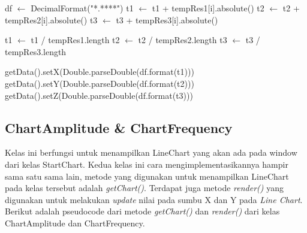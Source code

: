 \begin{itemize}
\begin{algorithm}
\begin{algorithmic}[1]
                    \State df $\leftarrow$ DecimalFormat("*.****")
                        \State t1 $\leftarrow$ t1 + tempRes1[i].absolute()
                        \State t2 $\leftarrow$ t2 + tempRes2[i].absolute()
                        \State t3 $\leftarrow$ t3 + tempRes3[i].absolute()
                    \EndFor
                    
                    \State t1 $\leftarrow$ t1 / tempRes1.length
                    \State t2 $\leftarrow$ t2 / tempRes2.length
                    \State t3 $\leftarrow$ t3 / tempRes3.length
                    
                    \State getData().setX(Double.parseDouble(df.format(t1)))
                    \State getData().setY(Double.parseDouble(df.format(t2)))
                    \State 
                    getData().setZ(Double.parseDouble(df.format(t3)))
                \EndIf
            \EndFunction
        \end{algorithmic}
    \end{algorithm}
\end{itemize}

\subsection{ChartAmplitude \& ChartFrequency}
Kelas ini berfungsi untuk menampilkan LineChart yang akan ada pada window dari kelas StartChart. Kedua kelas ini cara mengimplementasikannya hampir sama satu sama lain, metode yang digunakan untuk menampilkan LineChart pada kelas tersebut adalah \textit{getChart()}. Terdapat juga metode \textit{render()} yang digunakan untuk melakukan \textit{update} nilai pada sumbu X dan Y pada \textit{Line Chart}. Berikut adalah pseudocode dari metode \textit{getChart()} dan \textit{render()} dari kelas ChartAmplitude dan ChartFrequency.

